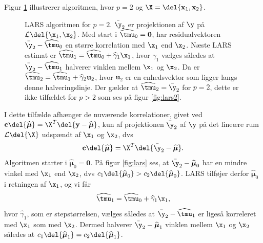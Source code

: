 Figur \ref{fig:lars1} illustrerer algoritmen, hvor $p = 2$ og $\X = \del{\textbf{x}_1, \textbf{x}_2}$.
%
\begin{figure}[H]
\centering
\scalebox{0.8}{}
\caption{LARS algoritmen for \(p=2\). \(\bar{\y}_2\) er projektionen af \(\y\) på \(\mathcal{L} \del{\x_1, \x_2}\).
Med start i \(\widehat{\tmu}_0=\mathbf{0}\), har residualvektoren \(\bar{\y}_2 - \widehat{\tmu}_0\) en større korrelation med \(\x_1\) end \(\x_2\). Næste LARS estimat er \(\widehat{\tmu}_1 = \widehat{\tmu}_0 + \widehat{\gamma}_1 \x_1\), hvor \(\widehat{\gamma}_1\) vælges således at \(\bar{\y}_2 - \widehat{\tmu}_1\) halverer vinklen mellem \(\x_1\) og \(\x_2\). Da er \(\widehat{\tmu}_2 = \widehat{\tmu}_1 + \widehat{\gamma}_2 \mathbf{u}_2\), hvor \(\mathbf{u}_2\) er en enhedsvektor som ligger langs denne halveringslinje.
Der gælder at \(\widehat{\tmu}_2 = \bar{\y}_2\) for \(p=2\), dette er ikke tilfældet for \(p>2\) som ses på figur \ref{fig:lars2}.
 }\label{fig:lars1}
\end{figure}
%
I dette tilfælde afhænger de nuværende korrelationer, givet ved \(\textbf{c}\del{\boldsymbol{\widehat{\mu}}} = \X^T\del{\textbf{y} - \widehat{\boldsymbol{\mu}}}\), kun af projektionen \(\bar{\y}_2\) af \(\y\) på det lineære rum $\mathcal{L} \del{\X}$ udspændt af \(\x_1\) og \(\x_2\), dvs 
\begin{align*}
\textbf{c}\del{\boldsymbol{\widehat{\mu}}} =  \X^T \del{ \bar{\y}_2 - \boldsymbol{\widehat{\mu}}}.
\end{align*}
Algoritmen starter i $\widehat{\boldsymbol{\mu}}_0 = \textbf{0}$.
På figur \ref{fig:lars} ses, at \(\bar{\y}_2 - \widehat{\boldsymbol{\mu}}_0\) har en mindre vinkel med \(\x_1\) end \(\x_2\), dvs \(c_1 \del{\widehat{\boldsymbol{\mu}}_0} > c_2 \del{\widehat{\boldsymbol{\mu}}_0}\).
LARS tilføjer derfor \(\widehat{\boldsymbol{\mu}}_0\) i retningen af \(\x_1\), og vi får
\begin{align*}
\widehat{\tmu}_1 = \widehat{\tmu}_0 + \widehat{\gamma}_1 \x_1,
\end{align*}
hvor \(\widehat{\gamma}_1\), som er stepstørrelsen, vælges således at  \(\bar{\y}_2 - \widehat{\tmu}_1\) er ligeså korreleret med \(\x_1\) som med \(\x_2\).
Dermed halverer \(\bar{\y}_2 - \widehat{\boldsymbol{\mu}}_1\) vinklen mellem \(\x_1\) og \(\x_2\) således at \(c_1 \del{\widehat{\boldsymbol{\mu}}_1} = c_2 \del{\widehat{\boldsymbol{\mu}}_1}\).

